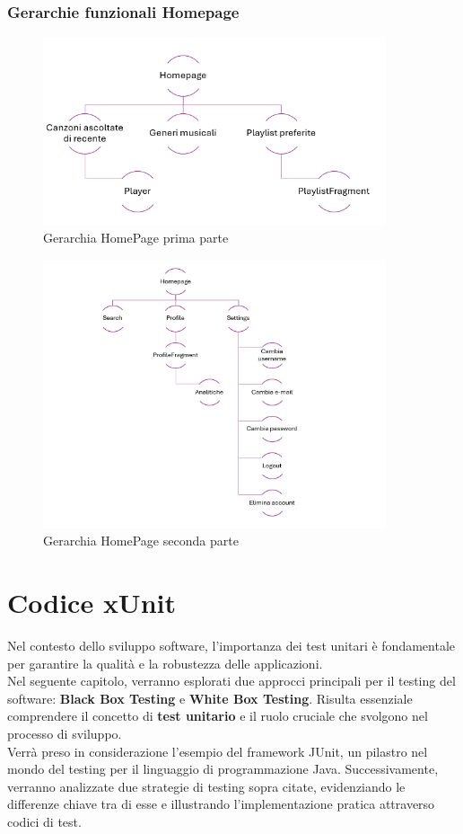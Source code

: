 \documentclass{article}
\begin{document}
		\subsubsection{Gerarchie funzionali Homepage}
		\begin{figure}[H]
			\centering
			\includegraphics[width=0.9\textwidth]{Immagini/gerarchiahome1}
			\caption{Gerarchia HomePage prima parte}
		\end{figure}
		\begin{figure}[H]
			\centering
			\includegraphics[width=0.9\textwidth]{Immagini/gerarchiahome2}
			\caption{Gerarchia HomePage seconda parte}
		\end{figure}
		\newpage
	\section{Codice xUnit}
	Nel contesto dello sviluppo software, l'importanza dei test unitari è fondamentale per garantire la qualità e la robustezza delle applicazioni.\\
	Nel seguente capitolo, verranno esplorati due approcci principali per il testing del software: \textbf{Black Box Testing} e \textbf{White Box Testing}. 
	Risulta essenziale comprendere il concetto di \textbf{test unitario} e il ruolo cruciale che svolgono nel processo di sviluppo.\\
	Verrà preso in considerazione l'esempio del framework JUnit, un pilastro nel mondo del testing per il linguaggio di programmazione Java. Successivamente, verranno analizzate due strategie di testing sopra citate, evidenziando le differenze chiave tra di esse e illustrando l'implementazione pratica attraverso codici di test.\\
	
\end{document}
